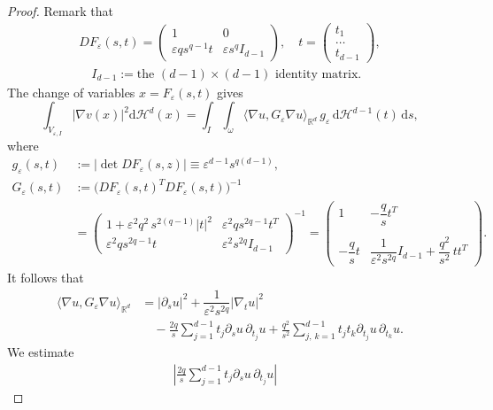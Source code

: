 \documentclass[11pt,oneside,reqno,a4paper]{amsart}
\newcommand{\dd}{\mathrm{d}}
\newcommand{\R}{\mathbb{R}}
\renewcommand{\H}{\mathcal{H}}
\newcommand{\eps}{\varepsilon}
\theoremstyle{definition}
\begin{document}
\begin{proof}
Remark that
\begin{gather*}
DF_\eps(s,t)=\begin{pmatrix}
	1 & 0\\
	\eps q s^{q-1} t & \eps s^q I_{d-1}
\end{pmatrix},
\quad 
t=\begin{pmatrix}
	t_1\\
	\dots\\
	t_{d-1}
\end{pmatrix},\\
\quad
I_{d-1}:=\text{the $(d-1)\times (d-1)$ identity matrix.}
\end{gather*}
The change of variables $x=F_\eps(s,t)$ gives
\[
		\int_{V_{\eps,I}}\big|\nabla v(x)\big|^2\dd\H^d(x)=\int_I\int_{\omega}\big\langle\nabla u,G_\eps\nabla u\big\rangle_{\R^d} \,g_\eps \,\dd\H^{d-1}(t)\,\dd s,
\]
where
\begin{align*}
g_\eps(s,t)&:=\Big|\det DF_\eps(s,z)\Big|\equiv \eps^{d-1}s^{q(d-1)},\\
G_\eps(s,t)&:=\Big(DF_\eps(s,t)^{T}DF_\eps(s,t)\Big)^{-1}\\
&=
		\begin{pmatrix}
			1+\eps^2q^2\,s^{2(q-1)}|t|^2 & \eps^2 q s^{2q-1}t^T\\
			\eps^2 qs^{2q-1}t & \eps^2 s^{2q}I_{d-1}
		\end{pmatrix}^{-1}
=
		\begin{pmatrix}
			1 & -\dfrac{q}{s}t^T\\
			\\
			-\dfrac{q}{s}t  & \dfrac{1}{\eps^2s^{2q}}I_{d-1}+ \dfrac{q^2}{s^2}\, t t^T
		\end{pmatrix}.
\end{align*}
It follows that
	\begin{equation}\label{est of inner product}
		\begin{aligned}
		\langle\nabla u,G_\eps\nabla u\rangle_{\R^d}&=|\partial_su|^2+\dfrac{1}{\eps^2s^{2q}}|\nabla_tu|^2\\
		&\quad-\frac{2q}{s}\sum_{j=1}^{d-1}t_j\partial_su\,\partial_{t_j}u+\frac{q^2}{s^2}\sum_{j,\,k=1}^{d-1}t_jt_k\partial_{t_j}u\,\partial_{t_k}u.
		\end{aligned}
	\end{equation}
We estimate	
\begin{equation}\label{est of inner product 1term}
\begin{aligned}
\left|\frac{2q}{s}\sum_{j=1}^{d-1}t_j\partial_su\,\partial_{t_j}u\right|&

\end{aligned}
\end{equation}
\end{proof}
\end{document}
